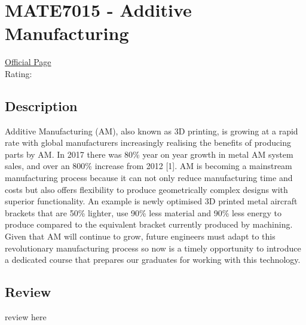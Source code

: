 \hypertarget{MATE7015}{\section{MATE7015 - Additive Manufacturing}}

\large
\textcolor{turbo_purple}{\href{https://my.uq.edu.au/programs-courses/course.html?course_code=MATE7015}{Official Page}} \\
Rating: \cstar\cstar\cstar\cstar\ostar

\normalsize
\subsection*{Description}
Additive Manufacturing (AM), also known as 3D printing, is growing at a rapid rate with global manufacturers increasingly realising the benefits of producing parts by AM.
In 2017 there was 80\% year on year growth in metal AM system sales, and over an 800\% increase from 2012 [1].
AM is becoming a mainstream manufacturing process because it can not only reduce manufacturing time and costs but also offers flexibility to produce geometrically complex designs with superior functionality.
An example is newly optimised 3D printed metal aircraft brackets that are 50\% lighter, use 90\% less material and 90\% less energy to produce compared to the equivalent bracket currently produced by machining.
Given that AM will continue to grow, future engineers must adapt to this revolutionary manufacturing process so now is a timely opportunity to introduce a dedicated course that prepares our graduates for working with this technology.

\subsection*{Review}
review here

